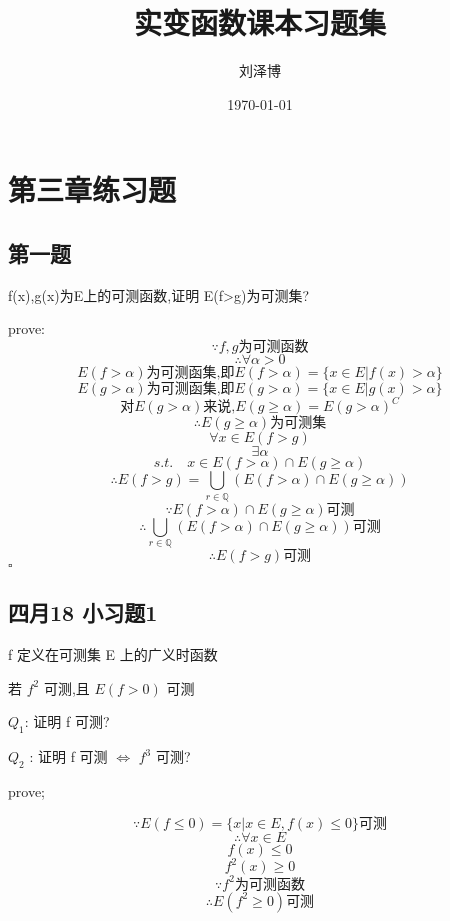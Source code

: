 \documentclass[a4paper]{article}
\title{实变函数课本习题集}
\author{刘泽博}
\date{\today}
\begin{document}
    \maketitle
    \tableofcontents
    \section{第三章练习题}    
    \subsection{第一题}

    f(x),g(x)为E上的可测函数,证明 E(f>g)为可测集?

    prove:
    \[\because f,g\text{为可测函数}\]
    \[\therefore \forall \alpha >0\]
    \[E(f>\alpha)\text{为可测函集,即}E(f>\alpha)=\{x\in E | f(x)>\alpha\}\]
    \[E(g>\alpha)\text{为可测函集,即}E(g>\alpha)=\{x\in E | g(x)>\alpha\}\]
    \[\text{对}E(g>\alpha)\text{来说,}E(g\ge\alpha)=E(g>\alpha)^C\]
    \[\therefore E(g\ge\alpha)\text{为可测集}\]
    \[\forall x \in E(f>g)\]
    \[\exists \alpha\]
    \[s.t. \quad x\in E(f>\alpha) \cap E(g \ge \alpha)\]
    \[\therefore E(f>g)=\bigcup_{r\in \mathbb{Q}}(E(f>\alpha)\cap E(g\ge \alpha))\]
    \[\because E(f>\alpha)\cap E(g\ge\alpha)\text{可测}\]
    \[\therefore \bigcup_{r\in \mathbb{Q}}(E(f>\alpha)\cap E(g\ge \alpha))\text{可测}\]
    \[\therefore E(f>g)\text{可测}\]
    \hfill $\square$

    \subsection{四月18 小习题1}
    
    f 定义在可测集 E 上的广义时函数

    若 $f^2$ 可测,且 $E(f>0)$ 可测

    $Q_1$: 证明 f 可测?

    $Q_2$ : 证明 f 可测 $\Leftrightarrow$ $f^3$ 可测?

    prove;

    \[\because E(f \le 0)=\{x|x\in E,f(x) \le 0\}\text{可测}\]
    \[\therefore \forall x \in E\]
    \[f(x)\le 0\]
    \[f^2(x)\ge 0\]
    \[\because f^2 \text{为可测函数}\]
    \[\therefore E(f^2\ge 0)\text{可测}\]
    \[\]
    
\end{document}
